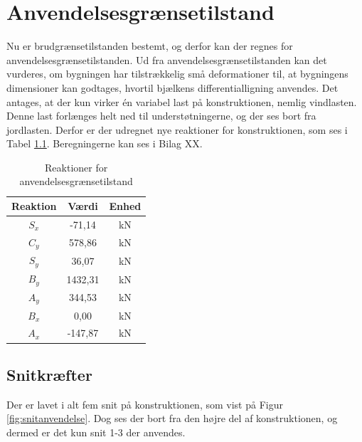\chapter{Anvendelsesgrænsetilstand}
Nu er brudgrænsetilstanden bestemt, og derfor kan der regnes for anvendelsesgrænsetilstanden. Ud fra anvendelsesgrænsetilstanden kan det vurderes, om bygningen har tilstrækkelig små deformationer til, at bygningens dimensioner kan godtages, hvortil bjælkens differentialligning anvendes. 
\newline \indent{     }  Det antages, at der kun virker én variabel last på konstruktionen, nemlig vindlasten. Denne last forlænges helt ned til understøtningerne, og der ses bort fra jordlasten. Derfor er der udregnet nye reaktioner for konstruktionen, som ses i Tabel \ref{tab:anden}. Beregningerne kan ses i Bilag XX. 

\begin{table}
	\begin{center}
		\begin{tabular}{|c|c|c|}
			\hline
			Reaktion & Værdi & Enhed \\ \hline
			$S_x$ & -71,14 		& kN      \\ \hline
			$C_y$ & 578,86 		& kN      \\ \hline
			$S_y$ & 36,07 		& kN       \\ \hline
			$B_y$ & 1432,31 	& kN      \\ \hline
			$A_y$ & 344,53 		& kN      \\ \hline
			$B_x$ & 0,00 		& kN      \\ \hline
			$A_x$ & -147,87 	& kN       \\ \hline
		\end{tabular}
		\caption{Reaktioner for anvendelsesgrænsetilstand}
		\label{tab:anden}
	\end{center}
\end{table}

\section{Snitkræfter}
Der er lavet i alt fem snit på konstruktionen, som vist på Figur \ref{fig:snitanvendelse}. Dog ses der bort fra den højre del af konstruktionen, og dermed er det kun snit 1-3 der anvendes. 

